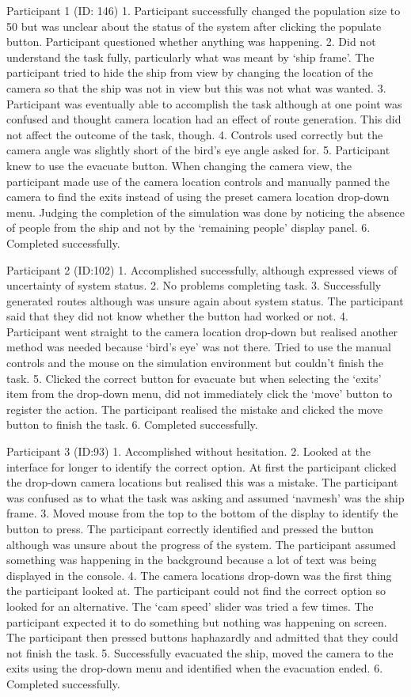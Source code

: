 Participant 1 (ID: 146)
1. Participant successfully changed the population size to 50 but was unclear about the status of the system after clicking the populate button. Participant questioned whether anything was happening.
2. Did not understand the task fully, particularly what was meant by ‘ship frame’. The participant tried to hide the ship from view by changing the location of the camera so that the ship was not in view but this was not what was wanted.
3. Participant was eventually able to accomplish the task although at one point was confused and thought camera location had an effect of route generation. This did not affect the outcome of the task, though.
4. Controls used correctly but the camera angle was slightly short of the bird’s eye angle asked for.
5. Participant knew to use the evacuate button. When changing the camera view, the participant made use of the camera location controls and manually panned the camera to find the exits instead of using the preset camera location drop-down menu. Judging the completion of the simulation was done by noticing the absence of people from the ship and not by the ‘remaining people’ display panel.
6. Completed successfully.

Participant 2 (ID:102)
1. Accomplished successfully, although expressed views of uncertainty of system status.
2. No problems completing task.
3. Successfully generated routes although was unsure again about system status. The participant said that they did not know whether the button had worked or not.
4. Participant went straight to the camera location drop-down but realised another method was needed because ‘bird’s eye’ was not there. Tried to use the manual controls and the mouse on the simulation environment but couldn’t finish the task.
5. Clicked the correct button for evacuate but when selecting the ‘exits’ item from the drop-down menu, did not immediately click the ‘move’ button to register the action. The participant realised the mistake and clicked the move button to finish the task.
6. Completed successfully.

Participant 3 (ID:93)
1. Accomplished without hesitation.
2. Looked at the interface for longer to identify the correct option. At first the participant clicked the drop-down camera locations but realised this was a mistake. The participant was confused as to what the task was asking and assumed ‘navmesh’ was the ship frame.
3. Moved mouse from the top to the bottom of the display to identify the button to press. The participant correctly identified and pressed the button although was unsure about the progress of the system. The participant assumed something was happening in the background because a lot of text was being displayed in the console.
4. The camera locations drop-down was the first thing the participant looked at. The participant could not find the correct option so looked for an alternative. The ‘cam speed’ slider was tried a few times. The participant expected it to do something but nothing was happening on screen. The participant then pressed buttons haphazardly and admitted that they could not finish the task.
5. Successfully evacuated the ship, moved the camera to the exits using the drop-down menu and identified when the evacuation ended.
6. Completed successfully.


